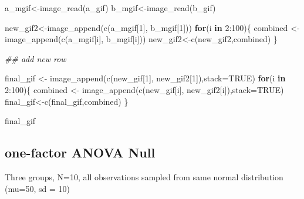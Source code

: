 \documentclass[
  letterpaper,
  DIV=11,
  numbers=noendperiod]{scrreprt}
\newenvironment{Shaded}{\begin{snugshade}}{\end{snugshade}}
\newcommand{\AttributeTok}[1]{\textcolor[rgb]{0.40,0.45,0.13}{#1}}
\newcommand{\ConstantTok}[1]{\textcolor[rgb]{0.56,0.35,0.01}{#1}}
\newcommand{\ControlFlowTok}[1]{\textcolor[rgb]{0.00,0.23,0.31}{\textbf{#1}}}
\newcommand{\DecValTok}[1]{\textcolor[rgb]{0.68,0.00,0.00}{#1}}
\newcommand{\DocumentationTok}[1]{\textcolor[rgb]{0.37,0.37,0.37}{\textit{#1}}}
\newcommand{\FunctionTok}[1]{\textcolor[rgb]{0.28,0.35,0.67}{#1}}
\newcommand{\NormalTok}[1]{\textcolor[rgb]{0.00,0.23,0.31}{#1}}
\newcommand{\OtherTok}[1]{\textcolor[rgb]{0.00,0.23,0.31}{#1}}
\newcommand{\SpecialCharTok}[1]{\textcolor[rgb]{0.37,0.37,0.37}{#1}}
\begin{document}
\begin{Shaded}
\begin{Highlighting}[]
\NormalTok{a\_mgif}\OtherTok{\textless{}{-}}\FunctionTok{image\_read}\NormalTok{(a\_gif)}
\NormalTok{b\_mgif}\OtherTok{\textless{}{-}}\FunctionTok{image\_read}\NormalTok{(b\_gif)}

\NormalTok{new\_gif2}\OtherTok{\textless{}{-}}\FunctionTok{image\_append}\NormalTok{(}\FunctionTok{c}\NormalTok{(a\_mgif[}\DecValTok{1}\NormalTok{], b\_mgif[}\DecValTok{1}\NormalTok{]))}
\ControlFlowTok{for}\NormalTok{(i }\ControlFlowTok{in} \DecValTok{2}\SpecialCharTok{:}\DecValTok{100}\NormalTok{)\{}
\NormalTok{  combined }\OtherTok{\textless{}{-}} \FunctionTok{image\_append}\NormalTok{(}\FunctionTok{c}\NormalTok{(a\_mgif[i], b\_mgif[i]))}
\NormalTok{  new\_gif2}\OtherTok{\textless{}{-}}\FunctionTok{c}\NormalTok{(new\_gif2,combined)}
\NormalTok{\}}

\DocumentationTok{\#\# add new row}

\NormalTok{final\_gif }\OtherTok{\textless{}{-}} \FunctionTok{image\_append}\NormalTok{(}\FunctionTok{c}\NormalTok{(new\_gif[}\DecValTok{1}\NormalTok{], new\_gif2[}\DecValTok{1}\NormalTok{]),}\AttributeTok{stack=}\ConstantTok{TRUE}\NormalTok{)}
\ControlFlowTok{for}\NormalTok{(i }\ControlFlowTok{in} \DecValTok{2}\SpecialCharTok{:}\DecValTok{100}\NormalTok{)\{}
\NormalTok{  combined }\OtherTok{\textless{}{-}} \FunctionTok{image\_append}\NormalTok{(}\FunctionTok{c}\NormalTok{(new\_gif[i], new\_gif2[i]),}\AttributeTok{stack=}\ConstantTok{TRUE}\NormalTok{)}
\NormalTok{  final\_gif}\OtherTok{\textless{}{-}}\FunctionTok{c}\NormalTok{(final\_gif,combined)}
\NormalTok{\}}

\NormalTok{final\_gif}
\end{Highlighting}
\end{Shaded}

\subsection{one-factor ANOVA Null}\label{one-factor-anova-null}

Three groups, N=10, all observations sampled from same normal
distribution (mu=50, sd = 10)
\end{document}

